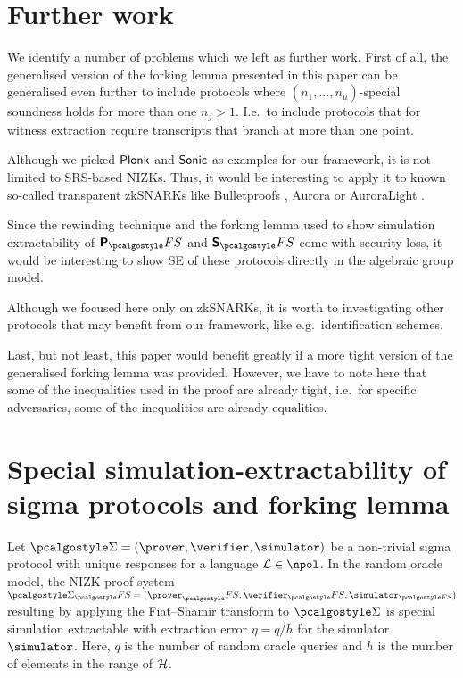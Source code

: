 \documentclass[runningheads,11pt]{llncs}
\begin{document}
\section{Further work}
We identify a number of problems which we left as further work. First of all,
the generalised version of the forking lemma presented in this paper can be
generalised even further to include protocols where $(n_1, \ldots,
n_\mu)$-special soundness holds for more than one $n_j > 1$. I.e.~to include
protocols that for witness extraction require transcripts that branch at more
than one point.

Although we picked $\textnormal{\textsf{Plonk}}$ and ${\textnormal{\textsf{Sonic}}}$ as examples for our framework, it is
not limited to SRS-based NIZKs. Thus, it would be interesting to apply it to
known so-called transparent zkSNARKs like Bulletproofs \cite{SP:BBBPWM18},
Aurora \cite{EC:BCRSVW19} or AuroraLight \cite{EPRINT:Gabizon19a}.

Since the rewinding technique and the forking lemma used to show simulation
extractability of $\plonkprotfs$ and $\sonicprotfs$ come with security loss,
it would be interesting to show SE of these protocols directly in the
algebraic group model.

Although we focused here only on zkSNARKs, it is worth to
investigating other protocols that may benefit from our framework, like
e.g.~identification schemes.

Last, but not least, this paper would benefit greatly if a more tight version
of the generalised forking lemma was provided. However, we have to note here
that some of the inequalities used in the proof are already tight, i.e.~for
specific adversaries, some of the inequalities are already equalities.




\appendix

\section{Special simulation-extractability of sigma protocols and forking lemma}
\label{sec:forking_lemma}
\begin{theorem}
	Let $\sigmaprot = (\prover, \verifier, \simulator)$ be a non-trivial sigma
  protocol with unique responses for a language $\LANG \in \npol$. In the random
  oracle model, the NIZK proof system $\sigmaprot_\fs = (\prover_\fs,
  \verifier_\fs, \simulator_{\fs})$ resulting by applying the Fiat--Shamir
  transform to $\sigmaprot$ is special simulation extractable with extraction error
  $\eta = q/h$ for the simulator $\simulator$. Here, $q$ is the number of random
  oracle queries and $h$ is the number of elements in the range of $\mathcal{H}$.
\end{theorem}
\end{document}
